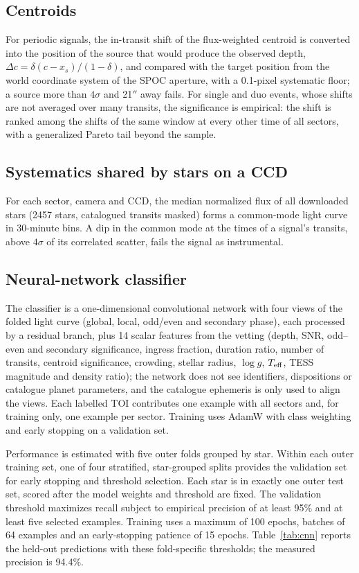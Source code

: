 \documentclass{aastex701}
\begin{document}
\subsection{Centroids}\label{sec:centroid}
For periodic signals, the in-transit shift of the flux-weighted centroid is converted into the
position of the source that would produce the observed depth, $\Delta c = \delta(c - x_s)/(1-\delta)$,
and compared with the target position from the world coordinate system of the SPOC aperture, with a
0.1-pixel systematic floor; a source more than $4\sigma$ and 21$''$ away fails. For single and duo
events, whose shifts are not averaged over many transits, the significance is empirical: the shift
is ranked among the shifts of the same window at every other time of all sectors, with a generalized
Pareto tail beyond the sample.

\subsection{Systematics shared by stars on a CCD}\label{sec:commonmode}
For each sector, camera and CCD, the median normalized flux of all downloaded stars (2457 stars,
catalogued transits masked) forms a common-mode light curve in 30-minute bins. A dip in the common
mode at the times of a signal's transits, above $4\sigma$ of its correlated scatter, fails the signal
as instrumental.

\subsection{Neural-network classifier}\label{sec:cnn}
The classifier is a one-dimensional convolutional network with four views of the folded light curve
(global, local, odd/even and secondary phase), each processed by a residual branch, plus 14 scalar
features from the vetting (depth, SNR, odd--even and secondary significance, ingress fraction,
duration ratio, number of transits, centroid significance, crowding, stellar radius, $\log g$,
$T_{\rm eff}$, TESS magnitude and density ratio); the network does not see identifiers, dispositions or
catalogue planet parameters, and the catalogue ephemeris is only used to align the views. Each
labelled TOI contributes one example with all sectors and, for training only, one example per sector.
Training uses AdamW with class weighting and early stopping on a validation set.

Performance is estimated with five outer folds grouped by star. Within each outer training set,
one of four stratified, star-grouped splits provides the validation set for early stopping and
threshold selection. Each star is in exactly one outer test set, scored after the model weights
and threshold are fixed. The validation threshold maximizes recall subject to
empirical precision of at least 95\% and at least five selected examples. Training uses a maximum
of 100 epochs, batches of 64 examples and an early-stopping patience of 15 epochs.
Table~\ref{tab:cnn} reports the held-out predictions with these fold-specific thresholds; the
measured precision is 94.4\%.
\end{document}
